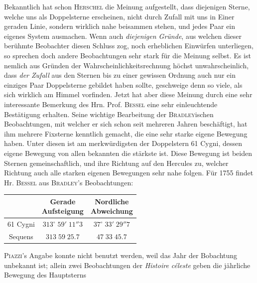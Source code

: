 \par\indent Bekanntlich hat schon \textsc{Herschel} die Meinung aufgestellt, dass diejenigen Sterne, welche uns als Doppelsterne erscheinen, nicht durch Zufall mit uns in Einer geraden Linie, sondern wirklich nahe beisammen stehen, und jedes Paar ein eigenes System ausmachen. Wenn auch \emph{diejenigen Gründe}, aus welchen dieser berühmte Beobachter diesen Schluss zog, noch erheblichen Einwürfen unterliegen, so sprechen doch andere Beobachtungen sehr stark für die Meinung selbst. Es ist nemlich aus Gründen der Wahrscheinlichkeitsrechnung höchst unwahrscheinlich, dass \emph{der Zufall} aus den Sternen bis zu einer gewissen Ordnung auch nur ein einziges Paar Doppelsterne gebildet haben sollte, geschweige denn so viele, als sich wirklich am Himmel vorfinden. Jetzt hat aber diese Meinung durch eine sehr interessante Bemerkung des Hrn. Prof. \textsc{Bessel} eine sehr einleuchtende Bestätigung erhalten. Seine wichtige Bearbeitung der \textsc{Bradley}ischen Beobachtungen, mit welcher er sich schon seit mehreren Jahren beschäftigt, hat ihm mehrere Fixsterne kenntlich gemacht, die eine sehr starke eigene Bewegung haben. Unter diesen ist am merkwürdigsten der Doppelstern 61 Cygni, dessen eigene Bewegung von allen bekannten die stärkste ist. Diese Bewegung ist beiden Sternen gemeinschaftlich, und ihre Richtung auf den Hercules zu, welcher Richtung auch alle starken eigenen Bewegungen sehr nahe folgen. Für 1755 findet Hr. \textsc{Bessel} aus \textsc{Bradley}'s Beobachtungen:

\begin{center}
\fontsize{10}{12}\selectfont\setlength{\tabcolsep}{3pt}\renewcommand{\arraystretch}{1.15}\begin{tabular}{c|c|c}
 & \shortstack{Gerade\\Aufsteigung} & \shortstack{Nordliche\\Abweichung} \\
\hline
61 Cygni & $313^\circ\;59'\;11''3$ & $37^\circ\;33'\;29''7$ \\
Sequens & $313\;59\;25.7$ & $47\;33\;45.7$ \\
\end{tabular}
\end{center}

\noindent \textsc{Piazzi}'s Angabe konnte nicht benutzt werden, weil das Jahr der Bobachtung unbekannt ist; allein zwei Beobachtungen der \emph{Histoire céleste} geben die jährliche Bewegung des Hauptsterns

